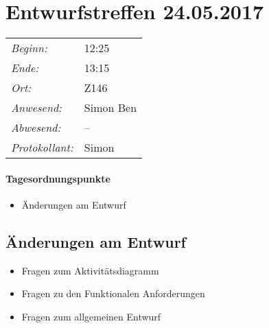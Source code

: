 \documentclass{scrartcl}
\date{24.05.2017}	%
\begin{document}
\maketitle
\section{Entwurfstreffen 24.05.2017}	%
\begin{tabular}[t]{p{.25\linewidth} p{.25\linewidth}}
\emph{Beginn:}				& 12:25\\
\emph{Ende:}					& 13:15\\
\emph{Ort:}						& Z146\\
\emph{Anwesend:}	& 
Simon\newline
Ben
\\
\emph{Abwesend:}		 & 
--
\\
\emph{Protokollant:}& Simon
\end{tabular}
\paragraph{Tagesordnungspunkte}
\begin{itemize}
\item Änderungen am Entwurf
\end{itemize}

\subsection{Änderungen am Entwurf}
\begin{itemize}
	\item Fragen zum Aktivitätsdiagramm
	\item Fragen zu den Funktionalen Anforderungen
	\item Fragen zum allgemeinen Entwurf
\end{itemize}
\end{document}
